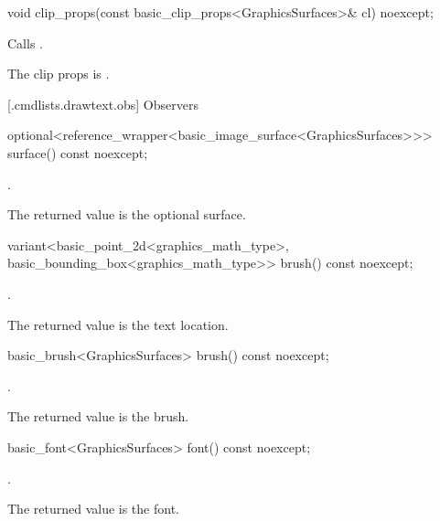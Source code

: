 %
\begin{itemdecl}
void clip_props(const basic_clip_props<GraphicsSurfaces>& cl) noexcept;
\end{itemdecl}
\begin{itemdescr}
\pnum
\effects Calls .

\pnum
\remarks The clip props is .
\end{itemdescr}

 [\iotwod.cmdlists.drawtext.obs] {Observers}%

%
\begin{itemdecl}
optional<reference_wrapper<basic_image_surface<GraphicsSurfaces>>> 
  surface() const noexcept;
\end{itemdecl}
\begin{itemdescr}
\pnum
\returns {}.

\pnum
\remarks
The returned value is the optional surface.
\end{itemdescr}

%
\begin{itemdecl}
variant<basic_point_2d<graphics_math_type>, basic_bounding_box<graphics_math_type>> brush() const noexcept;
\end{itemdecl}
\begin{itemdescr}
\pnum
\returns {}.

\pnum
\remarks The returned value is the text location.
\end{itemdescr}

%
\begin{itemdecl}
basic_brush<GraphicsSurfaces> brush() const noexcept;
\end{itemdecl}
\begin{itemdescr}
\pnum
\returns {}.

\pnum
\remarks The returned value is the brush.
\end{itemdescr}

%
\begin{itemdecl}
basic_font<GraphicsSurfaces> font() const noexcept;
\end{itemdecl}
\begin{itemdescr}
\pnum
\returns {}.

\pnum
\remarks The returned value is the font.
\end{itemdescr}

